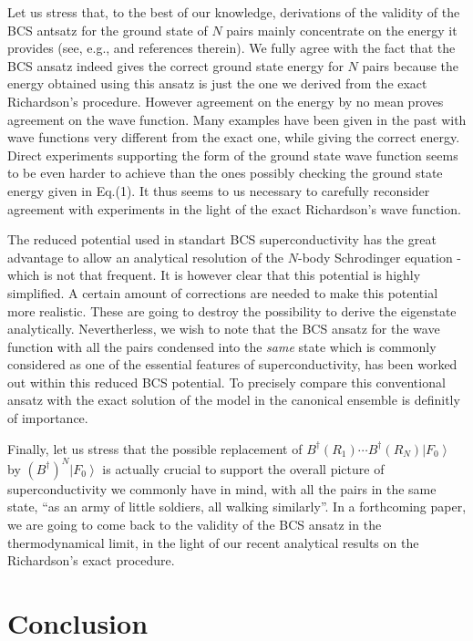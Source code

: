 \documentclass[aps,prb,superscriptaddress,showpacs,reprint,lengthcheck]{revtex4-1}
\begin{document}
Let us stress that, 
to the best of our knowledge,  derivations of the validity of the BCS antsatz for the ground state of $N$ pairs
mainly concentrate on the energy it provides 
(see, e.g., \cite{Schrieffer} and references therein).
 We fully agree with the fact that the BCS
ansatz indeed gives the correct ground state energy for $N$ pairs because the energy obtained using this ansatz
is just the one we derived from the exact Richardson's procedure. However
agreement on the energy by no mean proves agreement on the wave function.
Many examples have been given in the past with wave functions very different
from the exact one, while giving the correct energy. Direct
experiments supporting the form of the ground state wave function seems to be even harder to achieve than the ones possibly checking the ground state energy given in Eq.(1). 
It thus seems to us necessary to carefully reconsider agreement 
with experiments in the light of the exact Richardson's wave function. 

The reduced potential used in standart BCS superconductivity has the great advantage to allow an analytical resolution of the $N$-body Schrodinger equation - which is not that frequent. It is however clear that this potential is highly simplified. A certain amount of corrections are needed to make this potential more realistic. These are going to destroy the possibility to derive the eigenstate analytically. Nevertherless, we wish to note that  the BCS ansatz for the wave function with all the pairs condensed into the \emph{same} state which is commonly considered as one of the essential features of superconductivity, has been worked out within this reduced BCS potential. To precisely compare this conventional ansatz with the exact solution of the model in the canonical ensemble is definitly of importance.

Finally, let us stress that the possible replacement of $B^{\dagger}(R_1)\cdots{}B^{\dagger}(R_N)%
\left|F_0\right>  $ by $\left(B^{\dagger}\right) ^N\left|F_0\right>  $ is
actually crucial to support the overall picture of
superconductivity we commonly have in mind, with all the pairs in the same state, ``as an army of
little soldiers, all walking similarly''. 
In a forthcoming paper, we are going to come back to the validity of the BCS 
ansatz in the thermodynamical limit, in the light of our recent analytical results on the Richardson's exact procedure.

\section{Conclusion}
\end{document}
